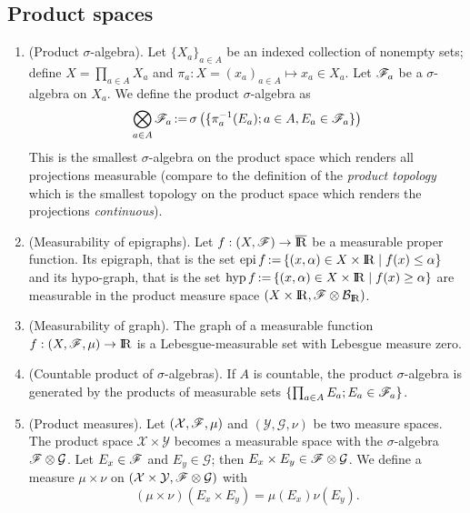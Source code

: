 \documentclass[a4paper,10pt]{scrbook}
\begin{document}
\subsection{Product spaces}
\begin{enumerate}
 \item (Product $\sigma$-algebra). Let $\{X_a\}_{a\in A}$ be an indexed collection of nonempty sets; define 
       $X=\prod_{a\in A}X_a$ and $\pi_a: X = (x_a)_{a\in A} \mapsto x_a\in X_a$. Let $\mathscr{F}_a$ be a $\sigma$-algebra
       on $X_a$. We define the product $\sigma$-algebra as
       \[
        \bigotimes_{a\in A} \mathscr{F}_a {}\mathop{\mathrel{:}=}{} \sigma\left( \{\pi_a^{-1}(E_a);a\in A, E_a\in \mathscr{F}_a\}\right)
       \]
       This is the smallest $\sigma$-algebra on the product space which renders all projections measurable
       (compare to the definition of the \textit{product topology} which is the smallest topology on 
       the product space which renders the projections \textit{continuous}).
       
 \item (Measurability of epigraphs). Let $f:(X,\F)\to\barre$ be a measurable proper function. Its epigraph, that is
       the set $\epi f \dfn \{(x,\alpha)\in X\times \Re {}\mid{} f(x) \leq \alpha\}$ and its hypo-graph, that is
       the set $\hyp f \dfn \{(x,\alpha) \in X\times \Re {}\mid{} f(x) \geq \alpha\}$ are measurable in the product
       measure space $(X\times \Re, \F\otimes \B_\Re)$.
       
 \item (Measurability of graph). The graph of a measurable function $f:(X,\F,\mu)\to\Re$ is a Lebesgue-measurable set 
       with Lebesgue measure zero.
       
 \item (Countable product of $\sigma$-algebras). If $A$ is countable, the product $\sigma$-algebra       
       is generated by the products of measurable sets $\{\prod_{a\in A}E_a; E_a\in \mathscr{F}_a\}$.
       
 \item (Product measures). Let $(\mathcal{X},\mathscr{F},\mu)$ and $(\mathcal{Y},\mathcal{G},\nu)$ be two measure spaces.
       The product space $\mathcal{X}\times \mathcal{Y}$ becomes a measurable space with the $\sigma$-algebra 
       $\mathscr{F}\otimes \mathcal{G}$. Let $E_x\in\mathscr{F}$ and $E_y\in\mathcal{G}$; then $E_x\times E_y\in\mathscr{F}\otimes \mathcal{G}$.
       We define a measure $\mu\times\nu$ on $(\mathcal{X}\times \mathcal{Y}, \mathscr{F}\otimes\mathcal{G})$ with 
       \[
        (\mu\times \nu)(E_x\times E_y) = \mu(E_x) \nu(E_y).
       \]
       

\end{enumerate}
\end{document}
